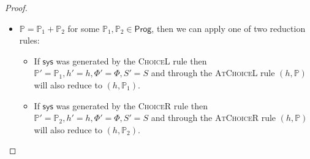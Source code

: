 \begin{proof}
\begin{itemize}
	\item $\mathds{P} = \mathds{P}_1 + \mathds{P}_2$ for some $\mathds{P}_1, \mathds{P}_2 \in \mathsf{Prog}$, then we can apply one of two reduction rules:
		\begin{itemize}
			\item If $\mathsf{sys}$ was generated by the \textsc{ChoiceL} rule then $\mathds{P}' = \mathds{P}_1, h' = h, \Phi' = \Phi, S' = S$ and through the \textsc{AtChoiceL} rule $(h, \mathds{P})$ will also reduce to $(h, \mathds{P}_1)$.
			\item If $\mathsf{sys}$ was generated by the \textsc{ChoiceR} rule then $\mathds{P}' = \mathds{P}_2, h' = h, \Phi' = \Phi, S' = S$ and through the \textsc{AtChoiceR} rule $(h, \mathds{P})$ will also reduce to $(h, \mathds{P}_2)$.
		\end{itemize}
\end{itemize}
\end{proof}